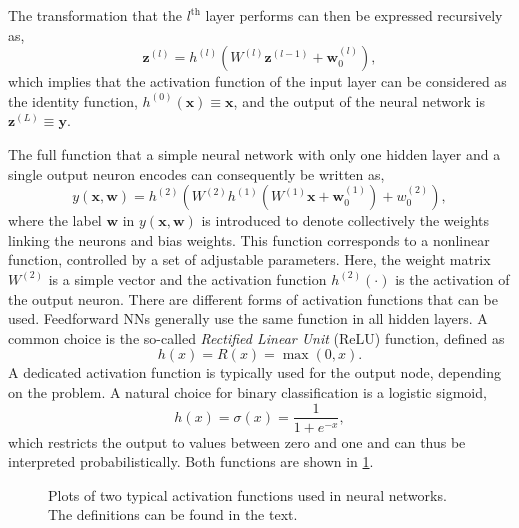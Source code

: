 The transformation that the $l^{\text{th}}$ layer performs can then be expressed recursively as,
\begin{equation}
    \label{eq:recursive-neuron-activation}
    \pmb{z}^{(l)} =  h^{(l)} \left( W^{(l)} \pmb{z}^{(l-1)}  + \pmb{w}^{(l)}_{0} \right),
\end{equation}
which implies that the activation function of the input layer can be considered as the identity function, $h^{(0)}(\pmb{x}) \equiv \pmb{x}$, and the output of the neural network is $ \pmb{z}^{(L)} \equiv \pmb{y}$.

The full function that a simple neural network with only one hidden layer and a single output neuron encodes can consequently be written as,
\begin{equation}
    y(\pmb{x}, \pmb{w}) = h^{(2)} \left( W^{(2)} h^{(1)} \left(  W^{(1)} \pmb{x} + \pmb{w}^{(1)}_{0}    \right) + w^{(2)}_{0} \right),
\end{equation}
where the label $\pmb{w}$ in $y(\pmb{x}, \pmb{w})$ is introduced to denote collectively the weights linking the neurons and bias weights.
This function corresponds to a nonlinear function, controlled by a set of adjustable parameters. Here, the weight matrix $W^{(2)}$ is a simple vector and the activation function $h^{(2)}(\cdot)$ is the activation of the output neuron.
There are different forms of activation functions that can be used.
Feedforward NNs generally use the same function in all hidden layers.
A common choice is the so-called \emph{Rectified Linear Unit} (ReLU) function, defined as
\begin{equation}
    {h(x)= R(x) = \max(0,x)}.    
\end{equation}
A dedicated activation function is typically used for the output node, depending on the problem.
A natural choice for binary classification is a logistic sigmoid,
\begin{equation}
    \label{eq:logistic-sigmoid}
    h(x)= \sigma(x) = {\frac {1}{1+e^{-x}}},
\end{equation}
which restricts the output to values between zero and one and can thus be interpreted probabilistically.
Both functions are shown in \cref{fig:sigmoid-relu}.

\begin{figure}[t]
    \caption{Plots of two typical activation functions used in neural networks. The definitions can be found in the text.}
    \label{fig:sigmoid-relu}
\end{figure}


